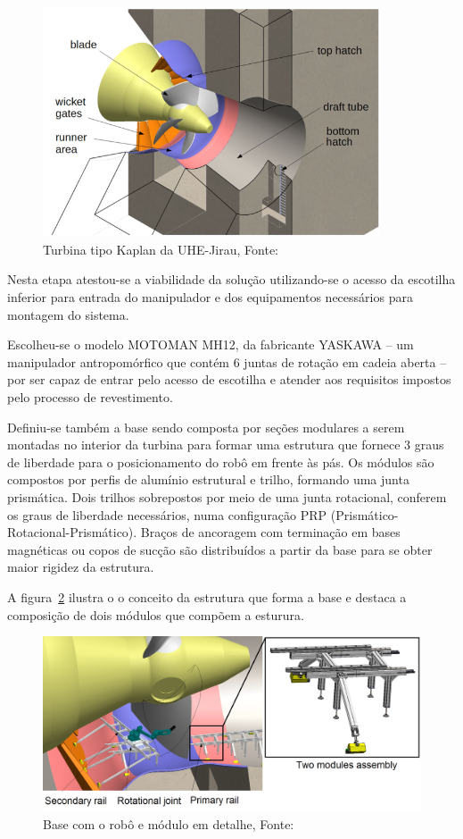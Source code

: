 \begin{figure}[h!]
\centering
\includegraphics[width=10cm]{figs/turbina.PNG}
\caption{Turbina tipo Kaplan da UHE-Jirau, Fonte:~\citet{Freitas2017}}
\label{fig::turbina}
\end{figure}

Nesta etapa atestou-se a viabilidade da solução utilizando-se o acesso da
escotilha inferior para entrada do manipulador e dos equipamentos necessários
para montagem do sistema. 

Escolheu-se o modelo MOTOMAN MH12, da fabricante YASKAWA -- um manipulador
antropomórfico que contém 6 juntas de rotação em cadeia aberta -- por ser capaz
de entrar pelo acesso de escotilha e atender aos requisitos impostos pelo
processo de revestimento.

Definiu-se também a base sendo composta por seções modulares a serem montadas no interior da turbina para formar uma estrutura que  fornece 3 graus de liberdade para o posicionamento do robô em frente às
pás. Os módulos são compostos por perfis de alumínio estrutural e trilho,
formando uma junta prismática. Dois trilhos sobrepostos por meio de uma junta
rotacional, conferem os graus de liberdade necessários, numa configuração PRP
(Prismático-Rotacional-Prismático).
Braços de ancoragem com terminação em bases magnéticas ou copos de sucção são distribuídos a partir da
base para se obter maior rigidez da estrutura. 

A figura~\ref{fig::modulo} ilustra o o conceito da estrutura que forma a base e
destaca a composição de dois módulos que compõem a esturura.

\begin{figure}[h!]
\centering
\includegraphics[width=12cm]{figs/modulo.PNG}
\caption{Base com o robô e módulo em detalhe, Fonte:~\citet{Freitas2017}}
\label{fig::modulo}
\end{figure}

